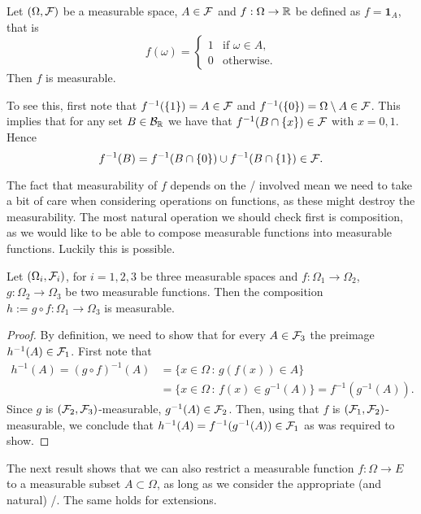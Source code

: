 \begin{example}
Let $(\Omega,\mathcal F)$ be a measurable space, $A \in \mathcal F$ and $f : \Omega \to \mathbb R$ be defined as $f = \mathbf{1}_A$, that is 
\[
	f(\omega) = \begin{cases}
		1 &\text{if } \omega \in A,\\
		0 &\text{otherwise.}
	\end{cases}
\]
Then $f$ is measurable.

To see this, first note that $f^{-1}(\{1\}) = A \in \mathcal F$ and $f^{-1}(\{0\}) = \Omega\setminus A \in \mathcal F$. This implies that for any set $B \in \mathcal B_{\mathbb R}$ we have that $f^{-1}(B \cap \{x\}) \in \mathcal F$ with $x = 0, 1$. Hence
\[
	f^{-1}(B) = f^{-1}(B \cap \{0\}) \cup f^{-1}(B \cap \{1\}) \in \mathcal F.
\]
\end{example}

The fact that measurability of $f$ depends on the \sigalgs/ involved mean we need to take a bit of care when considering operations on functions, as these might destroy the measurability. The most natural operation we should check first is composition, as we would like to be able to compose measurable functions into measurable functions. Luckily this is possible.

\begin{proposition}
Let $(\Omega_i, \mathcal F_i)$, for $i = 1,2,3$ be three measurable spaces and $f : \Omega_1 \to \Omega_2$, $g : \Omega_2 \to \Omega_3$ be two measurable functions. Then the composition $h := g \circ f : \Omega_1 \to \Omega_3$ is measurable.
\end{proposition}

\begin{proof}
By definition, we need to show that for every $A \in \mathcal F_3$ the preimage $h^{-1}(A) \in \mathcal F_1$. First note that
\begin{align*}
	h^{-1}(A) = (g\circ f)^{-1}(A) &= \{x \in \Omega \, : \, g(f(x)) \in A\} \\
	&= \{x \in \Omega \, : \, f(x) \in g^{-1}(A) \} = f^{-1}(g^{-1}(A)).
\end{align*}
Since $g$ is $(\mathcal F_2, \mathcal F_3)$-measurable, $g^{-1}(A) \in \mathcal F_2$. Then, using that $f$ is $(\mathcal F_1, \mathcal F_2)$-measurable, we conclude that $h^{-1}(A) = f^{-1}(g^{-1}(A)) \in \mathcal F_1$ as was required to show.
\end{proof}

The next result shows that we can also restrict a measurable function $f : \Omega \to E$ to a measurable subset $A \subset \Omega$, as long as we consider the appropriate (and natural) \sigalg/. The same holds for extensions. 

